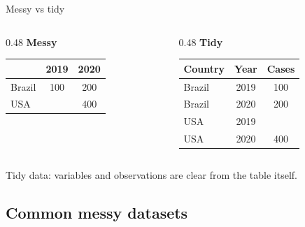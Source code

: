 \begin{frame}{Messy vs tidy}
  \begin{columns}[T]
    \begin{column}{0.48\textwidth}
      \textbf{Messy}\\[0.2cm]
      \centering\small
      \begin{tabular}{lcc}
        \toprule
         & \textbf{2019} & \textbf{2020} \\
        \midrule
        Brazil & 100 & 200 \\
        USA &  & 400 \\
        \bottomrule
      \end{tabular}
    \end{column}
    \begin{column}{0.48\textwidth}
      \textbf{Tidy}\\[0.2cm]
      \centering\small
      \begin{tabular}{lcc}
        \toprule
        \textbf{Country} & \textbf{Year} & \textbf{Cases} \\
        \midrule
        Brazil & 2019 & 100 \\
        Brazil & 2020 & 200 \\
        USA & 2019 & \\
        USA & 2020 & 400 \\
        \bottomrule
      \end{tabular}
    \end{column}
  \end{columns}

  \vspace{0.5cm}
  Tidy data: variables and observations are clear from the table itself.
\end{frame}

\subsection{Common messy datasets}

